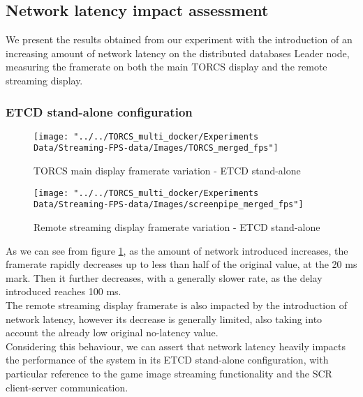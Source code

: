 \subsection{Network latency impact assessment}
We present the results obtained from our experiment with the introduction of an increasing amount of network latency on the distributed databases Leader node, measuring the framerate on both the main TORCS display and the remote streaming display.
\subsubsection{ETCD stand-alone configuration}
\begin{figure}[h!]
	\centering
	\texttt{[image: "../../TORCS\_multi\_docker/Experiments Data/Streaming-FPS-data/Images/TORCS\_merged\_fps"]}
	\caption[TORCS main display framerate variation - ETCD stand-alone]{TORCS main display framerate variation - ETCD stand-alone}
	\label{fig:torcs-merged-fps-etcd}
\end{figure}
\begin{figure}[h!]
	\centering
	\texttt{[image: "../../TORCS\_multi\_docker/Experiments Data/Streaming-FPS-data/Images/screenpipe\_merged\_fps"]}
	\caption[Remote streaming display framerate variation - ETCD stand-alone]{Remote streaming display framerate variation - ETCD stand-alone}
	\label{fig:screenpipe-merged-fps-etcd}
\end{figure}
As we can see from figure \ref{fig:torcs-merged-fps-etcd}, as the amount of network introduced increases, the framerate rapidly decreases up to less than half of the original value, at the 20 ms mark. Then it further decreases, with a generally slower rate, as the delay introduced reaches 100 ms. \\
The remote streaming display framerate is also impacted by the introduction of network latency, however its decrease is generally limited, also taking into account the already low original no-latency value. \\
Considering this behaviour, we can assert that network latency heavily impacts the performance of the system in its ETCD stand-alone configuration, with particular reference to the game image streaming functionality and the SCR client-server communication. 

